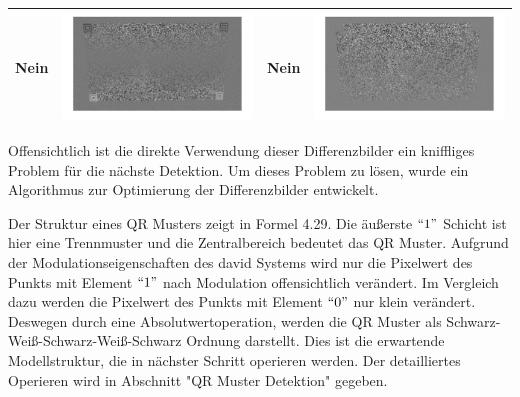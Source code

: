 \begin{table}[htb]
\begin{tabular}{|p{2cm}<{\centering}|c|p{2cm}<{\centering}|c|}
	Nein & \includegraphics[scale=0.15]{images/4_ZweiteErfahrung/Differenzbild/4halbschwaryhalbweis.pdf}& Nein & \includegraphics[scale=0.15]{images/4_ZweiteErfahrung/Differenzbild/5aufheben.pdf}\\

	\bottomrule
	\end{tabular}
\end{table} 


Offensichtlich ist die direkte Verwendung dieser Differenzbilder ein kniffliges Problem für die nächste Detektion. Um dieses Problem zu lösen, wurde ein Algorithmus zur Optimierung der Differenzbilder entwickelt.

Der Struktur eines QR Musters zeigt in Formel 4.29. Die äußerste $``1"$ Schicht ist hier eine Trennmuster und die Zentralbereich bedeutet das QR Muster. Aufgrund der Modulationseigenschaften des \gls{david} Systems wird nur die Pixelwert des Punkts mit Element $``1"$ nach Modulation offensichtlich verändert. Im Vergleich dazu werden die Pixelwert des Punkts mit Element $``0"$ nur klein verändert. Deswegen durch eine Absolutwertoperation, werden die QR Muster als Schwarz-Weiß-Schwarz-Weiß-Schwarz Ordnung darstellt. Dies ist die erwartende Modellstruktur, die in nächster Schritt operieren werden. Der detailliertes Operieren wird in Abschnitt "QR Muster Detektion" gegeben.

